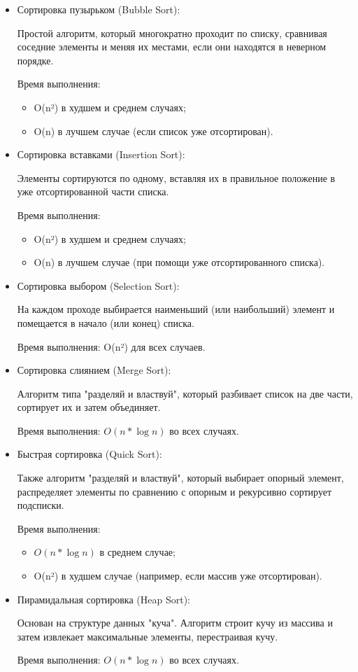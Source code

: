\begin{itemize}

\item Сортировка пузырьком (Bubble Sort):

Простой алгоритм, который многократно проходит по списку, сравнивая соседние элементы и меняя их местами, если они находятся в неверном порядке.

Время выполнения:
\begin{itemize}
\item O(n²) в худшем и среднем случаях;
\item O(n) в лучшем случае (если список уже отсортирован).
\end{itemize}

\item Сортировка вставками (Insertion Sort):

Элементы сортируются по одному, вставляя их в правильное положение в уже отсортированной части списка.

Время выполнения:
\begin{itemize}
\item O(n²) в худшем и среднем случаях;
\item O(n) в лучшем случае (при помощи уже отсортированного списка).
\end{itemize}

\item Сортировка выбором (Selection Sort):

На каждом проходе выбирается наименьший (или наибольший) элемент и помещается в начало (или конец) списка.

Время выполнения: O(n²) для всех случаев.

\item Сортировка слиянием (Merge Sort):

Алгоритм типа "разделяй и властвуй", который разбивает список на две части, сортирует их и затем объединяет.

Время выполнения: \(O(n * \log n)\) во всех случаях.

\item Быстрая сортировка (Quick Sort):

Также алгоритм "разделяй и властвуй", который выбирает опорный элемент, распределяет элементы по сравнению с опорным и рекурсивно сортирует подсписки.

Время выполнения:
\begin{itemize}
\item \(O(n * \log n)\) в среднем случае;
\item O(n²) в худшем случае (например, если массив уже отсортирован).
\end{itemize}

\item Пирамидальная сортировка (Heap Sort):

Основан на структуре данных "куча". Алгоритм строит кучу из массива и затем извлекает максимальные элементы, перестраивая кучу.

Время выполнения: \(O(n * \log n)\) во всех случаях.

\end{itemize}

